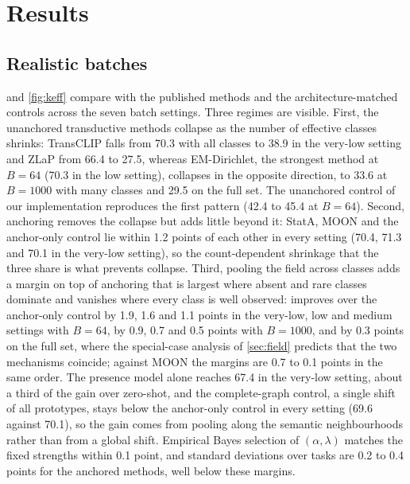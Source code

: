 \section{Results}
\label{sec:results}

\subsection{Realistic batches}
 and \cref{fig:keff} compare \method with the published methods and the architecture-matched controls across the seven batch settings. Three regimes are visible. First, the unanchored transductive methods collapse as the number of effective classes shrinks: TransCLIP falls from 70.3 with all classes to 38.9 in the very-low setting and ZLaP from 66.4 to 27.5, whereas EM-Dirichlet, the strongest method at $B{=}64$ (70.3 in the low setting), collapses in the opposite direction, to 33.6 at $B{=}1000$ with many classes and 29.5 on the full set. The unanchored control of our implementation reproduces the first pattern (42.4 to 45.4 at $B{=}64$). Second, anchoring removes the collapse but adds little beyond it: StatA, MOON and the anchor-only control lie within 1.2 points of each other in every setting (70.4, 71.3 and 70.1 in the very-low setting), so the count-dependent shrinkage that the three share is what prevents collapse. Third, pooling the field across classes adds a margin on top of anchoring that is largest where absent and rare classes dominate and vanishes where every class is well observed: \method improves over the anchor-only control by 1.9, 1.6 and 1.1 points in the very-low, low and medium settings with $B{=}64$, by 0.9, 0.7 and 0.5 points with $B{=}1000$, and by 0.3 points on the full set, where the special-case analysis of \cref{sec:field} predicts that the two mechanisms coincide; against MOON the margins are 0.7 to 0.1 points in the same order. The presence model alone reaches 67.4 in the very-low setting, about a third of the gain over zero-shot, and the complete-graph control, a single shift of all prototypes, stays below the anchor-only control in every setting (69.6 against 70.1), so the gain comes from pooling along the semantic neighbourhoods rather than from a global shift. Empirical Bayes selection of $(\alpha,\lambda)$ matches the fixed strengths within 0.1 point, and standard deviations over tasks are 0.2 to 0.4 points for the anchored methods, well below these margins.

